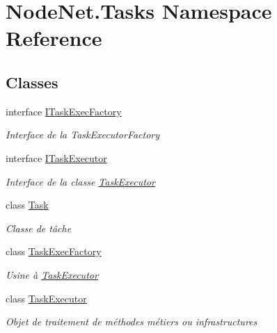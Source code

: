\hypertarget{namespace_node_net_1_1_tasks}{}\section{Node\+Net.\+Tasks Namespace Reference}
\label{namespace_node_net_1_1_tasks}
\subsection*{Classes}
\begin{DoxyCompactItemize}
\item 
interface \hyperlink{interface_node_net_1_1_tasks_1_1_i_task_exec_factory}{I\+Task\+Exec\+Factory}
\begin{DoxyCompactList}\small\item\em Interface de la Task\+Executor\+Factory \end{DoxyCompactList}\item 
interface \hyperlink{interface_node_net_1_1_tasks_1_1_i_task_executor}{I\+Task\+Executor}
\begin{DoxyCompactList}\small\item\em Interface de la classe \hyperlink{class_node_net_1_1_tasks_1_1_task_executor}{Task\+Executor} \end{DoxyCompactList}\item 
class \hyperlink{class_node_net_1_1_tasks_1_1_task}{Task}
\begin{DoxyCompactList}\small\item\em Classe de tâche \end{DoxyCompactList}\item 
class \hyperlink{class_node_net_1_1_tasks_1_1_task_exec_factory}{Task\+Exec\+Factory}
\begin{DoxyCompactList}\small\item\em Usine à \hyperlink{class_node_net_1_1_tasks_1_1_task_executor}{Task\+Executor} \end{DoxyCompactList}\item 
class \hyperlink{class_node_net_1_1_tasks_1_1_task_executor}{Task\+Executor}
\begin{DoxyCompactList}\small\item\em Objet de traitement de méthodes métiers ou infrastructures \end{DoxyCompactList}\end{DoxyCompactItemize}
